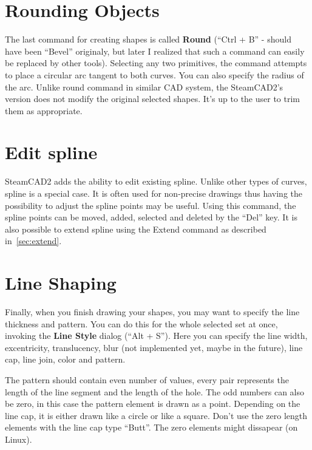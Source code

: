 \section{Rounding Objects}

The last command for creating shapes is called \textbf{Round} (``Ctrl + B'' - should have
been ``Bevel'' originaly, but later I realized that such a command can easily be replaced
by other tools). Selecting any two primitives, the command attempts to place a circular
arc tangent to both curves. You can also specify the radius of the arc. Unlike round
command in similar CAD system, the SteamCAD2's version does not modify the original
selected shapes. It's up to the user to trim them as appropriate.

\section{Edit spline}

SteamCAD2 adds the ability to edit existing spline. Unlike other types of curves, spline
is a special case. It is often used for non-precise drawings thus having the possibility
to adjust the spline points may be useful. Using this command, the spline points can be moved,
added, selected and deleted by the ``Del'' key. It is also possible to extend spline using
the Extend command as described in~\ref{sec:extend}.

\section{Line Shaping}

Finally, when you finish drawing your shapes, you may want to specify the line
thickness and pattern. You can do this for the whole selected set at once, invoking
the \textbf{Line Style} dialog (``Alt + S''). Here you can specify the line width,
excentricity, translucency, blur (not implemented yet, maybe in the future), line
cap, line join, color and pattern.

The pattern should contain even number of values, every pair represents the length
of the line segment and the length of the hole. The odd numbers can also be zero,
in this case the pattern element is drawn as a point. Depending on the line cap,
it is either drawn like a circle or like a square. Don't use the zero length elements
with the line cap type ``Butt''. The zero elements might dissapear (on Linux).

